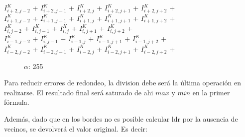 \begin{center}
$I_{i+2,j-2}^{K}$ + $I_{i+2,j-1}^{K}$ + $I_{i+2,j}^{K}$ + $I_{i+2,j+1}^{K}$ + $I_{i+2,j+2}^{K}$ +\\
$I_{i+1,j-2}^{K}$ + $I_{i+1,j-1}^{K}$ + $I_{i+1,j}^{K}$ + $I_{i+1,j+1}^{K}$ + $I_{i+1,j+2}^{K}$ +\\
$I_{i,j-2}^{K}$ + $I_{i,j-1}^{K}$ + $I_{i,j}^{K}$ + $I_{i,j+1}^{K}$ + $I_{i,j+2}^{K}$ +\\
$I_{i-1,j-2}^{K}$ + $I_{i,j-1}^{K}$ + $I_{i-1,j}^{K}$ + $I_{i-1,j+1}^{K}$ + $I_{i-1,j+2}^{K}$ +\\ 
$I_{i-2,j-2}^{K}$ + $I_{i-2,j-1}^{K}$ + $I_{i-2,j}^{K}$ + $I_{i-2,j+1}^{K}$ + $I_{i-2,j+2}^{K}$ +\\
\end{center}

\begin{figure}
  \centering
  \hfill
  \caption{$\alpha$: 255}
\end{figure}


Para reducir errores de redondeo, la division debe será la última operación en realizarse.
El resultado final será saturado de ahi $max$ y $min$ en la primer fórmula.

Además, dado que en los bordes no es posible calcular ldr por la ausencia de vecinos, se devolverá
el valor original. Es decir:


